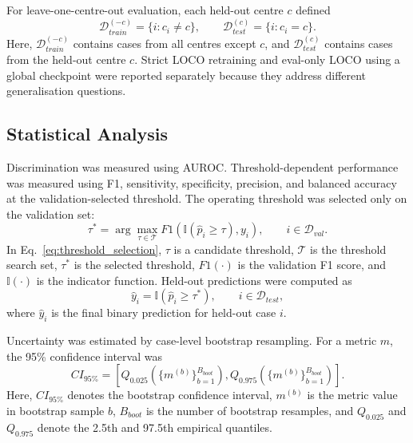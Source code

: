 For leave-one-centre-out evaluation, each held-out centre \(c\) defined
\begin{equation}
\mathcal{D}_{train}^{(-c)}=\{i:c_i\neq c\},
\qquad
\mathcal{D}_{test}^{(c)}=\{i:c_i=c\}.
\label{eq:loco_split}
\end{equation}
Here, \(\mathcal{D}_{train}^{(-c)}\) contains cases from all centres except \(c\), and \(\mathcal{D}_{test}^{(c)}\) contains cases from the held-out centre \(c\). Strict LOCO retraining and eval-only LOCO using a global checkpoint were reported separately because they address different generalisation questions.

\subsection{Statistical Analysis}
\label{subsec:methods_statistics}

Discrimination was measured using AUROC. Threshold-dependent performance was measured using F1, sensitivity, specificity, precision, and balanced accuracy at the validation-selected threshold. The operating threshold was selected only on the validation set:
\begin{equation}
\tau^{*}
=
\arg\max_{\tau\in\mathcal{T}}
F1\left(\mathbb{I}(\hat{p}_i\geq\tau),y_i\right),
\qquad i\in\mathcal{D}_{val}.
\label{eq:threshold_selection}
\end{equation}
In Eq.~\eqref{eq:threshold_selection}, \(\tau\) is a candidate threshold, \(\mathcal{T}\) is the threshold search set, \(\tau^*\) is the selected threshold, \(F1(\cdot)\) is the validation F1 score, and \(\mathbb{I}(\cdot)\) is the indicator function. Held-out predictions were computed as
\begin{equation}
\hat{y}_i=\mathbb{I}(\hat{p}_i\geq\tau^{*}),
\qquad i\in\mathcal{D}_{test},
\label{eq:test_prediction}
\end{equation}
where \(\hat{y}_i\) is the final binary prediction for held-out case \(i\).

Uncertainty was estimated by case-level bootstrap resampling. For a metric \(m\), the 95\% confidence interval was
\begin{equation}
CI_{95\%}
=
\left[
Q_{0.025}\left(\{m^{(b)}\}_{b=1}^{B_{boot}}\right),
Q_{0.975}\left(\{m^{(b)}\}_{b=1}^{B_{boot}}\right)
\right].
\label{eq:bootstrap_ci}
\end{equation}
Here, \(CI_{95\%}\) denotes the bootstrap confidence interval, \(m^{(b)}\) is the metric value in bootstrap sample \(b\), \(B_{boot}\) is the number of bootstrap resamples, and \(Q_{0.025}\) and \(Q_{0.975}\) denote the 2.5th and 97.5th empirical quantiles.


